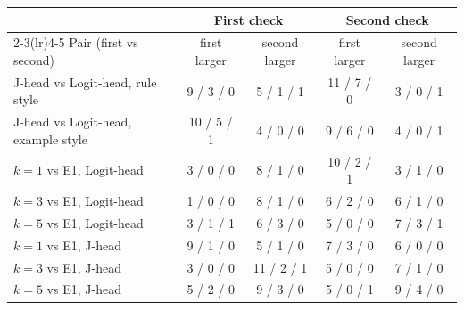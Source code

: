 \begin{tabular}{@{}lcccc@{}}
\toprule
 & \multicolumn{2}{c}{First check} & \multicolumn{2}{c}{Second check} \\
\cmidrule(lr){2-3}\cmidrule(lr){4-5}
Pair (first vs second) & first larger & second larger & first larger & second larger \\
\midrule
J-head vs Logit-head, rule style & 9 / 3 / 0 & 5 / 1 / 1 & 11 / 7 / 0 & 3 / 0 / 1 \\
J-head vs Logit-head, example style & 10 / 5 / 1 & 4 / 0 / 0 & 9 / 6 / 0 & 4 / 0 / 1 \\
$k=1$ vs E1, Logit-head & 3 / 0 / 0 & 8 / 1 / 0 & 10 / 2 / 1 & 3 / 1 / 0 \\
$k=3$ vs E1, Logit-head & 1 / 0 / 0 & 8 / 1 / 0 & 6 / 2 / 0 & 6 / 1 / 0 \\
$k=5$ vs E1, Logit-head & 3 / 1 / 1 & 6 / 3 / 0 & 5 / 0 / 0 & 7 / 3 / 1 \\
$k=1$ vs E1, J-head & 9 / 1 / 0 & 5 / 1 / 0 & 7 / 3 / 0 & 6 / 0 / 0 \\
$k=3$ vs E1, J-head & 3 / 0 / 0 & 11 / 2 / 1 & 5 / 0 / 0 & 7 / 1 / 0 \\
$k=5$ vs E1, J-head & 5 / 2 / 0 & 9 / 3 / 0 & 5 / 0 / 1 & 9 / 4 / 0 \\
\bottomrule
\end{tabular}
